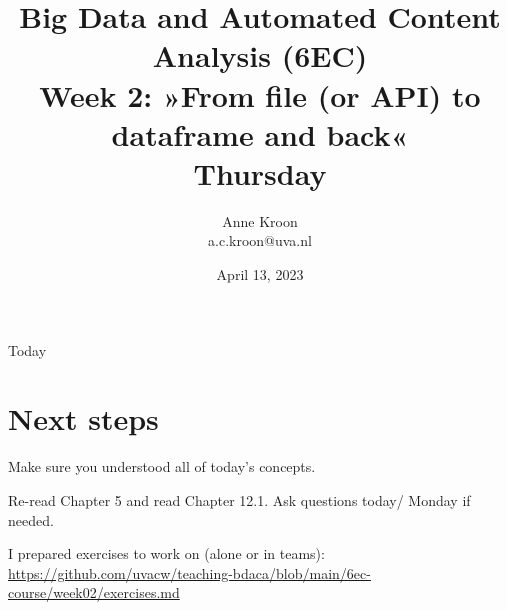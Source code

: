 

\graphicspath{{../../resources/img/}}




\title[Big Data and Automated Content Analysis]{\textbf{Big Data and Automated Content Analysis (6EC)} 
\\Week 2: »From file (or API) to dataframe and back«
\\Thursday }
\author[Anne Kroon]{Anne Kroon\\ \footnotesize{a.c.kroon@uva.nl \\}}
\date{April 13, 2023}


\begin{frame}{}
	\titlepage
\end{frame}

\begin{frame}{Today}
	\tableofcontents
\end{frame}

	








\section{Next steps}




\begin{frame}[standout]
Make sure you understood all of today's concepts.

Re-read Chapter 5 and read Chapter 12.1. Ask questions today/ Monday if needed.

I prepared exercises to work on (alone or in teams):
\large{\url{https://github.com/uvacw/teaching-bdaca/blob/main/6ec-course/week02/exercises.md}}
\end{frame}





\begin{frame}
	\printbibliography
\end{frame}




